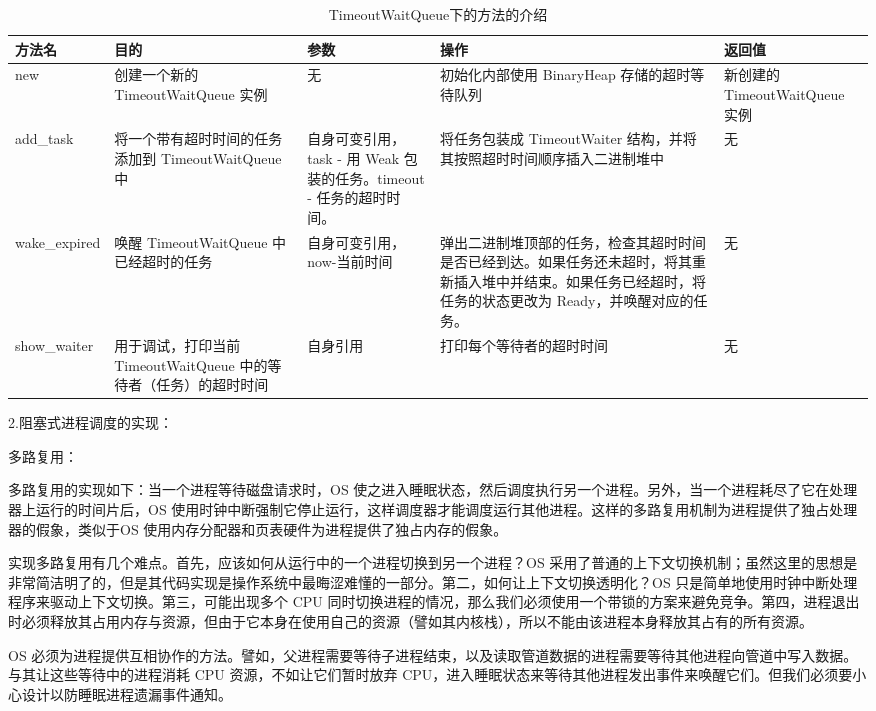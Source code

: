 \begin{table}[H]
    \caption{TimeoutWaitQueue下的方法的介绍}
    \begin{tabularx}{17cm}{|X|X|X|X|X|}
        \hline
        方法名 & 目的 & 参数 & 操作 & 返回值 \\
        \hline
        new & 创建一个新的 TimeoutWaitQueue 实例 & 无 & 初始化内部使用 BinaryHeap 存储的超时等待队列 & 新创建的 TimeoutWaitQueue 实例 \\
        \hline
        add_task & 将一个带有超时时间的任务添加到 TimeoutWaitQueue 中 & 自身可变引用，task - 用 Weak 包装的任务。timeout - 任务的超时时间。 &  将任务包装成 TimeoutWaiter 结构，并将其按照超时时间顺序插入二进制堆中 & 无 \\
        \hline
        wake_expired & 唤醒 TimeoutWaitQueue 中已经超时的任务 & 自身可变引用，now-当前时间 & 弹出二进制堆顶部的任务，检查其超时时间是否已经到达。如果任务还未超时，将其重新插入堆中并结束。如果任务已经超时，将任务的状态更改为 Ready，并唤醒对应的任务。 & 无 \\
        \hline
        show_waiter & 用于调试，打印当前 TimeoutWaitQueue 中的等待者（任务）的超时时间 & 自身引用 & 打印每个等待者的超时时间 & 无 \\
        \hline
    \end{tabularx}
\end{table}

2.阻塞式进程调度的实现：

多路复用：

多路复用的实现如下：当一个进程等待磁盘请求时，OS 使之进入睡眠状态，然后调度执行另一个进程。另外，当一个进程耗尽了它在处理器上运行的时间片后，OS 使用时钟中断强制它停止运行，这样调度器才能调度运行其他进程。这样的多路复用机制为进程提供了独占处理器的假象，类似于OS 使用内存分配器和页表硬件为进程提供了独占内存的假象。

实现多路复用有几个难点。首先，应该如何从运行中的一个进程切换到另一个进程？OS 采用了普通的上下文切换机制；虽然这里的思想是非常简洁明了的，但是其代码实现是操作系统中最晦涩难懂的一部分。第二，如何让上下文切换透明化？OS 只是简单地使用时钟中断处理程序来驱动上下文切换。第三，可能出现多个 CPU 同时切换进程的情况，那么我们必须使用一个带锁的方案来避免竞争。第四，进程退出时必须释放其占用内存与资源，但由于它本身在使用自己的资源（譬如其内核栈），所以不能由该进程本身释放其占有的所有资源。

OS 必须为进程提供互相协作的方法。譬如，父进程需要等待子进程结束，以及读取管道数据的进程需要等待其他进程向管道中写入数据。与其让这些等待中的进程消耗 CPU 资源，不如让它们暂时放弃 CPU，进入睡眠状态来等待其他进程发出事件来唤醒它们。但我们必须要小心设计以防睡眠进程遗漏事件通知。

